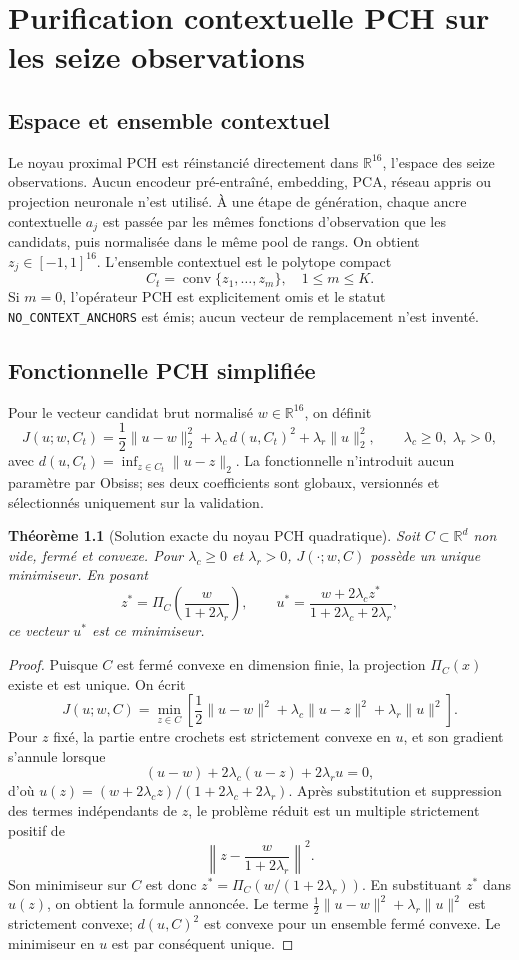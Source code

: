 \documentclass[11pt,a4paper]{report}
\newtheorem{theorem}[definition]{Théorème}
\newcommand{\R}{\mathbb R}
\newcommand{\conv}{\operatorname{conv}}
\begin{document}
\chapter{Purification contextuelle PCH sur les seize observations}
\section{Espace et ensemble contextuel}
Le noyau proximal PCH est réinstancié directement dans $\R^{16}$, l'espace des seize observations. Aucun encodeur pré-entraîné, embedding, PCA, réseau appris ou projection neuronale n'est utilisé. À une étape de génération, chaque ancre contextuelle $a_j$ est passée par les mêmes fonctions d'observation que les candidats, puis normalisée dans le même pool de rangs. On obtient $z_j\in[-1,1]^{16}$. L'ensemble contextuel est le polytope compact
\[
 C_t=\conv\{z_1,\ldots,z_m\},\quad 1\le m\le K.
\]
Si $m=0$, l'opérateur PCH est explicitement omis et le statut \texttt{NO\_CONTEXT\_ANCHORS} est émis; aucun vecteur de remplacement n'est inventé.

\section{Fonctionnelle PCH simplifiée}
Pour le vecteur candidat brut normalisé $w\in\R^{16}$, on définit
\[
 J(u;w,C_t)=\frac12\|u-w\|_2^2+\lambda_c\,d(u,C_t)^2+\lambda_r\|u\|_2^2,
 \qquad \lambda_c\ge0,\;\lambda_r>0,
\]
avec $d(u,C_t)=\inf_{z\in C_t}\|u-z\|_2$. La fonctionnelle n'introduit aucun paramètre par Obsiss; ses deux coefficients sont globaux, versionnés et sélectionnés uniquement sur la validation.

\begin{theorem}[Solution exacte du noyau PCH quadratique]
Soit $C\subset\R^d$ non vide, fermé et convexe. Pour $\lambda_c\ge0$ et $\lambda_r>0$, $J(\cdot;w,C)$ possède un unique minimiseur. En posant
\[
 z^*=\Pi_C\!\left(\frac{w}{1+2\lambda_r}\right),\qquad
 u^*=\frac{w+2\lambda_c z^*}{1+2\lambda_c+2\lambda_r},
\]
ce vecteur $u^*$ est ce minimiseur.
\end{theorem}
\begin{proof}
Puisque $C$ est fermé convexe en dimension finie, la projection $\Pi_C(x)$ existe et est unique. On écrit
\[
 J(u;w,C)=\min_{z\in C}\left[\frac12\|u-w\|^2+\lambda_c\|u-z\|^2+\lambda_r\|u\|^2\right].
\]
Pour $z$ fixé, la partie entre crochets est strictement convexe en $u$, et son gradient s'annule lorsque
\[
 (u-w)+2\lambda_c(u-z)+2\lambda_r u=0,
\]
d'où $u(z)=(w+2\lambda_c z)/(1+2\lambda_c+2\lambda_r)$. Après substitution et suppression des termes indépendants de $z$, le problème réduit est un multiple strictement positif de
\[
 \left\|z-\frac{w}{1+2\lambda_r}\right\|^2.
\]
Son minimiseur sur $C$ est donc $z^*=\Pi_C(w/(1+2\lambda_r))$. En substituant $z^*$ dans $u(z)$, on obtient la formule annoncée. Le terme $\frac12\|u-w\|^2+\lambda_r\|u\|^2$ est strictement convexe; $d(u,C)^2$ est convexe pour un ensemble fermé convexe. Le minimiseur en $u$ est par conséquent unique.
\end{proof}
\end{document}
